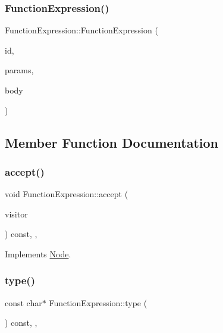 \subsubsection{\texorpdfstring{Function\+Expression()}{FunctionExpression()}}
{\footnotesize\ttfamily Function\+Expression\+::\+Function\+Expression (\begin{DoxyParamCaption}\item[{\hyperlink{struct_identifier}{Identifier} $\ast$}]{id,  }\item[{\hyperlink{struct_formal_parameter_list}{Formal\+Parameter\+List} $\ast$}]{params,  }\item[{\hyperlink{struct_function_body}{Function\+Body} $\ast$}]{body }\end{DoxyParamCaption})\hspace{0.3cm}{\ttfamily [inline]}}



\subsection{Member Function Documentation}
\mbox{\label{struct_function_expression_a66981757d45045284b41aecc85973434}} 
\subsubsection{\texorpdfstring{accept()}{accept()}}
{\footnotesize\ttfamily void Function\+Expression\+::accept (\begin{DoxyParamCaption}\item[{\hyperlink{struct_visitor}{Visitor} \&}]{visitor }\end{DoxyParamCaption}) const\hspace{0.3cm}{\ttfamily [inline]}, {\ttfamily [override]}, {\ttfamily [virtual]}}



Implements \hyperlink{struct_node_a10bd7af968140bbf5fa461298a969c71}{Node}.

\mbox{\label{struct_function_expression_a77dba3202da208b3ba1583dd192856dd}} 
\subsubsection{\texorpdfstring{type()}{type()}}
{\footnotesize\ttfamily const char$\ast$ Function\+Expression\+::type (\begin{DoxyParamCaption}{ }\end{DoxyParamCaption}) const\hspace{0.3cm}{\ttfamily [inline]}, {\ttfamily [override]}, {\ttfamily [virtual]}}



